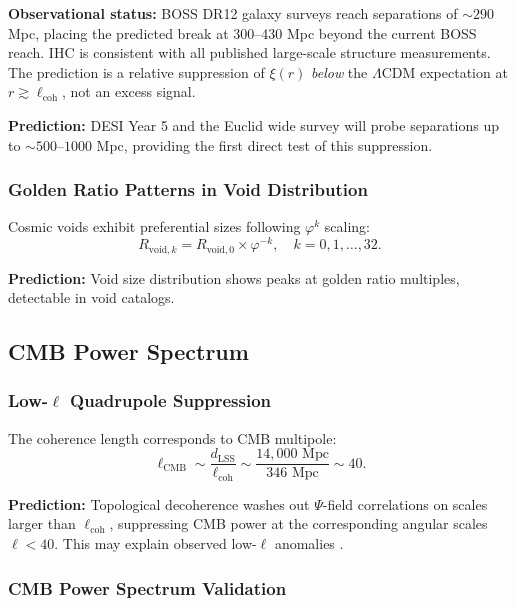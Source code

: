 \textbf{Observational status:} BOSS DR12 galaxy surveys reach separations of $\sim 290$ Mpc, placing the predicted break at 300--430 Mpc beyond the current BOSS reach. IHC is consistent with all published large-scale structure measurements. The prediction is a relative suppression of $\xi(r)$ \textit{below} the $\Lambda$CDM expectation at $r \gtrsim \ell_{\text{coh}}$, not an excess signal.

\textbf{Prediction:} DESI Year 5 and the Euclid wide survey will probe separations up to $\sim 500$--$1000$ Mpc, providing the first direct test of this suppression.

\subsubsection{Golden Ratio Patterns in Void Distribution}

Cosmic voids exhibit preferential sizes following $\varphi^k$ scaling:
\begin{equation}
R_{\text{void},k} = R_{\text{void},0} \times \varphi^{-k}, \quad k = 0, 1, \ldots, 32.
\end{equation}

\textbf{Prediction:} Void size distribution shows peaks at golden ratio multiples, detectable in void catalogs.

\subsection{CMB Power Spectrum}

\subsubsection{Low-$\ell$ Quadrupole Suppression}
\label{sec:cmb_quad}

The coherence length corresponds to CMB multipole:
\begin{equation}
\ell_{\text{CMB}} \sim \frac{d_{\text{LSS}}}{\ell_{\text{coh}}} \sim \frac{14{,}000 \text{ Mpc}}{346 \text{ Mpc}} \sim 40.
\end{equation}

\textbf{Prediction:} Topological decoherence washes out $\Psi$-field correlations on scales larger than $\ell_{\text{coh}}$, suppressing CMB power at the corresponding angular scales $\ell < 40$. This may explain observed low-$\ell$ anomalies \citep{Schwarz2016}.

\subsubsection{CMB Power Spectrum Validation}

